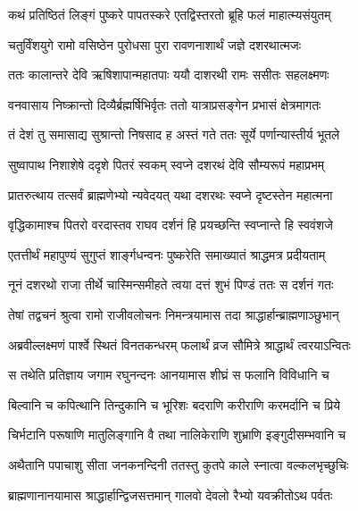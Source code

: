 \twolineshloka
{कथं प्रतिष्ठितं लिङ्गं पुष्करे पापतस्करे}
{एतद्विस्तरतो ब्रूहि फलं माहात्म्यसंयुतम्}%


\twolineshloka
{चतुर्विंशयुगे रामो वसिष्ठेन पुरोधसा}
{पुरा रावणनाशार्थं जज्ञे दशरथात्मजः}%

\twolineshloka
{ततः कालान्तरे देवि ऋषिशापान्महातपाः}
{ययौ दाशरथी रामः ससीतः सहलक्ष्मणः}%

\twolineshloka
{वनवासाय निष्क्रान्तो दिव्यैर्ब्रह्मर्षिभिर्वृतः}
{ततो यात्राप्रसङ्गेन प्रभासं क्षेत्रमागतः}%

\twolineshloka
{तं देशं तु समासाद्य सुश्रान्तो निषसाद ह}
{अस्तं गते ततः सूर्ये पर्णान्यास्तीर्य भूतले}%

\twolineshloka
{सुष्वापाथ निशाशेषे ददृशे पितरं स्वकम्}
{स्वप्ने दशरथं देवि सौम्यरूपं महाप्रभम्}%

\twolineshloka
{प्रातरुत्थाय तत्सर्वं ब्राह्मणेभ्यो न्यवेदयत्}
{यथा दशरथः स्वप्ने दृष्टस्तेन महात्मना}%


\twolineshloka
{वृद्धिकामाश्च पितरो वरदास्तव राघव}
{दर्शनं हि प्रयच्छन्ति स्वप्नान्ते हि स्ववंशजे}%

\twolineshloka
{एतत्तीर्थं महापुण्यं सुगुप्तं शार्ङ्गधन्वनः}
{पुष्करेति समाख्यातं श्राद्धमत्र प्रदीयताम्}%

\twolineshloka
{नूनं दशरथो राजा तीर्थे चास्मिन्समीहते}
{त्वया दत्तं शुभं पिण्डं ततः स दर्शनं गतः}%


\twolineshloka
{तेषां तद्वचनं श्रुत्वा रामो राजीवलोचनः}
{निमन्त्रयामास तदा श्राद्धार्हान्ब्राह्मणाञ्छुभान्}%

\twolineshloka
{अब्रवील्लक्ष्मणं पार्श्वे स्थितं विनतकन्धरम्}
{फलार्थं व्रज सौमित्रे श्राद्धार्थं त्वरयाऽन्वितः}%

\twolineshloka
{स तथेति प्रतिज्ञाय जगाम रघुनन्दनः}
{आनयामास शीघ्रं स फलानि विविधानि च}%

\twolineshloka
{बिल्वानि च कपित्थानि तिन्दुकानि च भूरिशः}
{बदराणि करीराणि करमर्दानि च प्रिये}%

\twolineshloka
{चिर्भटानि परूषाणि मातुलिङ्गानि वै तथा}
{नालिकेराणि शुभ्राणि इङ्गुदीसम्भवानि च}%

\twolineshloka
{अथैतानि पपाचाशु सीता जनकनन्दिनी}
{ततस्तु कुतपे काले स्नात्वा वल्कलभृच्छुचिः}%

\twolineshloka
{ब्राह्मणानानयामास श्राद्धार्हान्द्विजसत्तमान्}
{गालवो देवलो रैभ्यो यवक्रीतोऽथ पर्वतः}%

